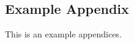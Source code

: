 \documentclass[final]{scrreprt} %
\begin{document}
\begin{appendices}
\renewcommand{\chapternumber}{\appendixname\space\thechapter} 
\chapter{Example Appendix}
\label{app:example}
This is an example appendices.

\end{appendices}
\end{document}
